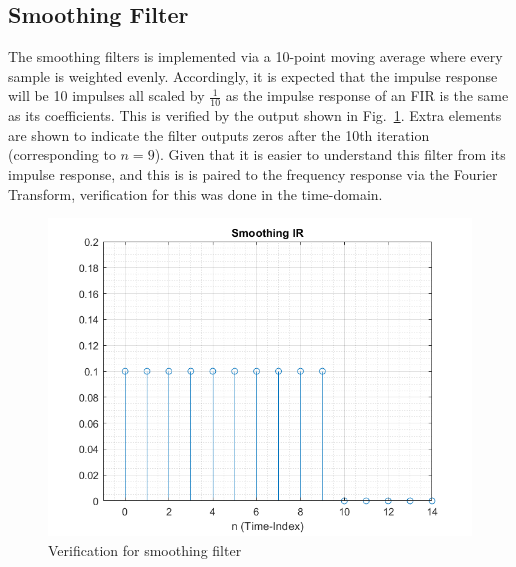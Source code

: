 \documentclass[../main.tex]{subfiles}
\begin{document}
\subsection{Smoothing Filter}
The smoothing filters is implemented via a 10-point moving average where every sample is weighted evenly. Accordingly, it is expected that the impulse response will be 10 impulses all scaled by $\frac{1}{10}$ as the impulse response of an FIR is the same as its coefficients. This is verified by the output shown in Fig.~\ref{fig:SmoothingIR}. Extra elements are shown to indicate the filter outputs zeros after the 10th iteration (corresponding to $n = 9$). Given that it is easier to understand this filter from its impulse response, and this is is paired to the frequency response via the Fourier Transform, verification for this was done in the time-domain.

\begin{figure}[h]
    \centering
    \includegraphics[scale=.65]{./images/plots/SmoothingIR.png}
    \caption{Verification for smoothing filter}
    \label{fig:SmoothingIR}
\end{figure}
\end{document}
